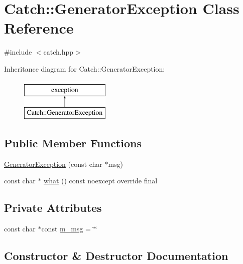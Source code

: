 \hypertarget{class_catch_1_1_generator_exception}{}\section{Catch\+::Generator\+Exception Class Reference}
\label{class_catch_1_1_generator_exception}


{\ttfamily \#include $<$catch.\+hpp$>$}

Inheritance diagram for Catch\+::Generator\+Exception\+:\begin{figure}[H]
\begin{center}
\leavevmode
\includegraphics[height=2.000000cm]{class_catch_1_1_generator_exception}
\end{center}
\end{figure}
\subsection*{Public Member Functions}
\begin{DoxyCompactItemize}
\item 
\mbox{\hyperlink{class_catch_1_1_generator_exception_a3cf9282d555ec32389665ce723bf36ea}{Generator\+Exception}} (const char $\ast$msg)
\item 
const char $\ast$ \mbox{\hyperlink{class_catch_1_1_generator_exception_ade029163144d136f12187e5b9a0161d5}{what}} () const noexcept override final
\end{DoxyCompactItemize}
\subsection*{Private Attributes}
\begin{DoxyCompactItemize}
\item 
const char $\ast$const \mbox{\hyperlink{class_catch_1_1_generator_exception_a493b6ec9e3be0e3852de73c87dba6e5e}{m\+\_\+msg}} = \char`\"{}\char`\"{}
\end{DoxyCompactItemize}


\subsection{Constructor \& Destructor Documentation}
\mbox{\label{class_catch_1_1_generator_exception_a3cf9282d555ec32389665ce723bf36ea}} 
